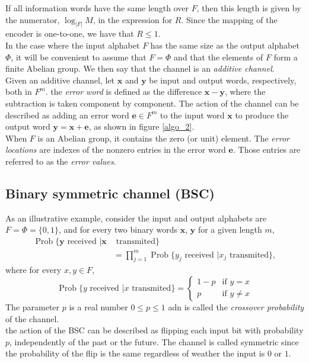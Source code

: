 If all information words have the same length over $F$, then this length is given by the numerator, $\log_{|F|}M$, in the expression for $R$. Since the mapping of the encoder is one-to-one, we have that $R\leq 1$.\\
In the case where the input alphabet $F$ has the same size as the output alphabet $\Phi$, it will be convenient to assume that $F=\Phi$ and that the elements of $F$ form a finite Abelian group. We then say that the channel is an \textit{additive channel}.\\
\indent Given an additive channel, let $\mathbf{x}$ and $\mathbf{y}$ be input and output words, respectively, both in $F^m$. the \textit{error word} is defined as the difference $\mathbf{x}-\mathbf{y}$, where the subtraction is taken component by component. The action of the channel can be described as adding an error word $\mathbf{e}\in F^m$ to the input word $\mathbf{x}$ to produce the output word $\mathbf{y} = \mathbf{x}+\mathbf{e}$, as shown in figure \ref{algo_2}.\\
\indent When $F$ is an Abelian group, it contains the zero (or unit) element. The \textit{error locations} are indexes of the nonzero entries in the error word $\mathbf{e}$. Those entries are referred to as the \textit{error values}.
\subsection{Binary symmetric channel (BSC)}
As an illustrative example, consider the input and output alphabets are $F=\Phi=\{0,1\}$, and for every two binary words $\mathbf{x}$, $\mathbf{y}$ for a given length $m$, 
\begin{align}
\operatorname{Prob}\{\mathbf{y}\text{ received }|\mathbf{x}&\text{ transmited}\} \nonumber \\
&=\prod_{j=1}^{m} \operatorname{Prob}\{y_j\text{ received }|x_j\text{ transmited}\},
\end{align}
where for every $x,y\in F$,
\begin{equation}
\operatorname{Prob}\{y\text{ received }|x\text{ transmited}\} = \left\{
    \begin{array}{ll}
        1-p & \mbox{if } y=x \\
        p & \mbox{if } y\neq x
    \end{array}
\right.
\end{equation}
The parameter $p$ is a real number $0\leq p\leq 1$ adn is called the \textit{crossover probability} of the channel.\\
\indent the action of the BSC can be described as flipping each input bit with probability $p$, independently of the past or the future. The channel is called symmetric since the probability of the flip is the same regardless of weather the input is $0$ or $1$.
